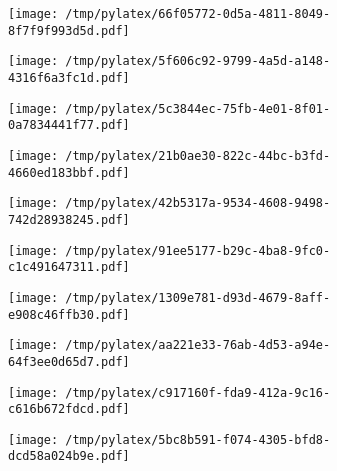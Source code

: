 \documentclass{article}
\begin{document}
\begin{figure}[htbp]
\begin{subfigure}[b]{.3\linewidth}
\texttt{[image: /tmp/pylatex/66f05772-0d5a-4811-8049-8f7f9f993d5d.pdf]}
\end{subfigure}
\begin{subfigure}[b]{.3\linewidth}
\texttt{[image: /tmp/pylatex/5f606c92-9799-4a5d-a148-4316f6a3fc1d.pdf]}
\end{subfigure}
\begin{subfigure}[b]{.3\linewidth}
\texttt{[image: /tmp/pylatex/5c3844ec-75fb-4e01-8f01-0a7834441f77.pdf]}
\end{subfigure}
\begin{subfigure}[b]{.3\linewidth}
\texttt{[image: /tmp/pylatex/21b0ae30-822c-44bc-b3fd-4660ed183bbf.pdf]}
\end{subfigure}
\begin{subfigure}[b]{.3\linewidth}
\texttt{[image: /tmp/pylatex/42b5317a-9534-4608-9498-742d28938245.pdf]}
\end{subfigure}
\begin{subfigure}[b]{.3\linewidth}
\texttt{[image: /tmp/pylatex/91ee5177-b29c-4ba8-9fc0-c1c491647311.pdf]}
\end{subfigure}
\begin{subfigure}[b]{.3\linewidth}
\texttt{[image: /tmp/pylatex/1309e781-d93d-4679-8aff-e908c46ffb30.pdf]}
\end{subfigure}
\begin{subfigure}[b]{.3\linewidth}
\texttt{[image: /tmp/pylatex/aa221e33-76ab-4d53-a94e-64f3ee0d65d7.pdf]}
\end{subfigure}
\begin{subfigure}[b]{.3\linewidth}
\texttt{[image: /tmp/pylatex/c917160f-fda9-412a-9c16-c616b672fdcd.pdf]}
\end{subfigure}
\begin{subfigure}[b]{.3\linewidth}
\texttt{[image: /tmp/pylatex/5bc8b591-f074-4305-bfd8-dcd58a024b9e.pdf]}
\end{subfigure}
\end{figure}
\end{document}
